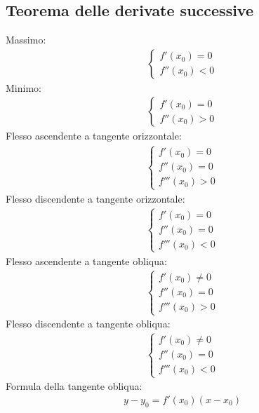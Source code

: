 \documentclass[a4paper]{article}
\begin{document}
	\subsection*{Teorema delle derivate successive}
	Massimo:\\
	\begin{align*}
		\begin{cases}
			f'(x_0) = 0\\
			f''(x_0) < 0
		\end{cases}
	\end{align*}
	Minimo:\\
	\begin{align*}
		\begin{cases}
			f'(x_0) = 0\\
			f''(x_0) > 0
		\end{cases}
	\end{align*}
	Flesso ascendente a tangente orizzontale:\\
	\begin{align*}
		\begin{cases}
			f'(x_0) = 0\\
			f''(x_0) = 0\\
			f'''(x_0) > 0
		\end{cases}
	\end{align*}
	Flesso discendente a tangente orizzontale:\\
	\begin{align*}
		\begin{cases}
			f'(x_0) = 0\\
			f''(x_0) = 0\\
			f'''(x_0) < 0
		\end{cases}
	\end{align*}	
	Flesso ascendente a tangente obliqua:\\
	\begin{align*}
	\begin{cases}
	f'(x_0) \ne 0\\
	f''(x_0) = 0\\
	f'''(x_0) > 0
	\end{cases}
	\end{align*}	
	Flesso discendente a tangente obliqua:\\
	\begin{align*}
	\begin{cases}
	f'(x_0) \ne 0\\
	f''(x_0) = 0\\
	f'''(x_0) < 0
	\end{cases}
	\end{align*}	
	Formula della tangente obliqua:
	\begin{align*}
		y-y_0 = f'(x_0)(x-x_0)
	\end{align*}
	
\end{document}
